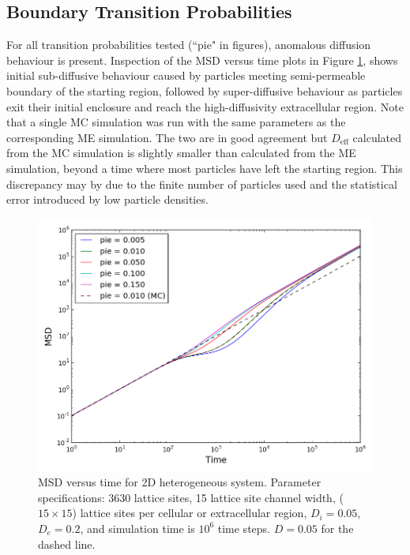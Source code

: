 \newpage
\subsection{Boundary Transition Probabilities}
\label{sec:2D-boundary-transition-probabilities}

	For all transition probabilities tested (``pie" in figures), anomalous diffusion behaviour is present. Inspection of the MSD versus time plots in Figure \ref{fig:pie_msd_2D}, shows initial sub-diffusive behaviour caused by particles meeting semi-permeable boundary of the starting region, followed by super-diffusive behaviour as particles exit their initial enclosure and reach the high-diffusivity extracellular region.  Note that a single MC simulation was run with the same parameters as the corresponding ME simulation. The two are in good agreement but $ D_\textrm{eff} $ calculated from the MC simulation is slightly smaller than calculated from the ME simulation, beyond a time where most particles have left the starting region. This discrepancy may by due to the finite number of particles used and the statistical error introduced by low particle densities.
	
	\begin{figure}[h!]
		\centering
		\includegraphics[width=1.0\linewidth]{../images/2D/pie_msd_2D}
		\caption{MSD versus time for 2D heterogeneous system. Parameter specifications: 3630 lattice sites, 15 lattice site channel width, ($ 15 \times 15 $) lattice sites per cellular or extracellular region, $ D_i = 0.05 $, $ D_e = 0.2 $, and simulation time is $ 10^6 $ time steps. $ D = 0.05 $ for the dashed line.}
		\label{fig:pie_msd_2D}
	\end{figure}
	
